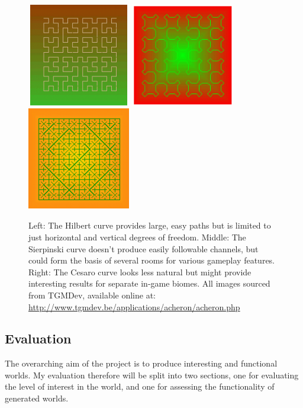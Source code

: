\documentclass[12pt,a4paper]{article}
\begin{document}
\begin{figure}
\centering
	\includegraphics[width=4.5cm,height=4.5cm]{images/hilbert.png}
	\includegraphics[width=4.5cm,height=4.5cm]{images/sierpinskicrv.png}
	\includegraphics[width=4.5cm,height=4.5cm]{images/cesaro.png}
	\caption[]{\label{fig:fig9} Left: The Hilbert curve provides large, easy paths but is limited to just horizontal and vertical degrees of freedom. Middle: The Sierpinski curve doesn't produce easily followable channels, but could form the basis of several rooms for various gameplay features. Right: The Cesaro curve looks less natural but might provide interesting results for separate in-game biomes. All images sourced from TGMDev, available online at: \url{http://www.tgmdev.be/applications/acheron/acheron.php}	}
	
\end{figure}


\subsection{Evaluation}

The overarching aim of the project is to produce interesting and functional worlds. My evaluation therefore will be split into two sections, one for evaluating the level of interest in the world, and one for assessing the functionality of generated worlds. \\
\end{document}
